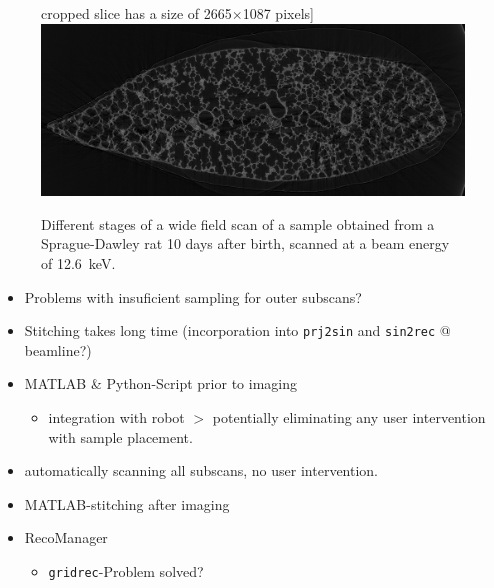 \begin{figure}[p]
\begin{minipage}[c][\textwidth]{\textwidth}
cropped slice has a size of 2665$\times$1087 pixels]{\label{subfig:wfs-slice}\includegraphics[width=\imsize]{img/correctedprojections/R108C10B_merge0989_rec_8bit_crop}}
	\caption{Different stages of a wide field scan of a sample obtained from a Sprague-Dawley rat 10 days after birth, scanned at a beam energy of \SI{12.6}{\kilo\electronvolt}.}
	\label{fig:wide field scan}
	\end{minipage}
\end{figure}

\begin{itemize}
	\item Problems with insuficient sampling for outer subscans?
	\item Stitching takes long time (incorporation into \verb+prj2sin+ and \verb+sin2rec+ @ beamline?)
\end{itemize}

\begin{itemize}
	\item MATLAB \& Python-Script prior to imaging
	\begin{itemize}
		\item integration with robot $>$ potentially eliminating any user intervention with sample placement.
	\end{itemize}
	\item automatically scanning all subscans, no user intervention.
	\item MATLAB-stitching after imaging
	\item RecoManager
	\begin{itemize}
		\item \verb+gridrec+-Problem solved?
	\end{itemize}
\end{itemize}